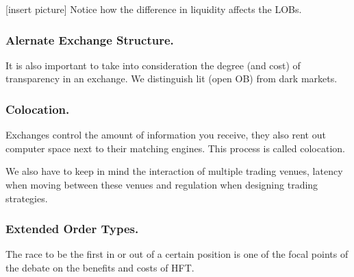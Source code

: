 \documentclass[11pt,a4paper]{article}
\theoremstyle{definition}
\theoremstyle{plain}
\theoremstyle{remark}
\newcommand{\1}{\mathbbm{1}}
\begin{document}
[insert picture] 
Notice how the difference in liquidity affects the LOBs. 

\subsubsection{Alernate Exchange Structure.}
It is also important to take into consideration the degree (and cost) of transparency in 
an exchange. We distinguish lit (open OB) from dark markets. 

\subsubsection{Colocation.} 
Exchanges control the amount of information you receive, they also rent out 
computer space next to their matching engines. This process is called colocation. 

We also have to keep in mind the interaction of multiple trading venues, 
latency when moving between these venues and regulation when designing trading strategies. 

\subsubsection{Extended Order Types.} 
The race to be the first in or out of a certain 
position is one of the focal points of the debate on the benefits and costs of 
HFT.
\end{document}
